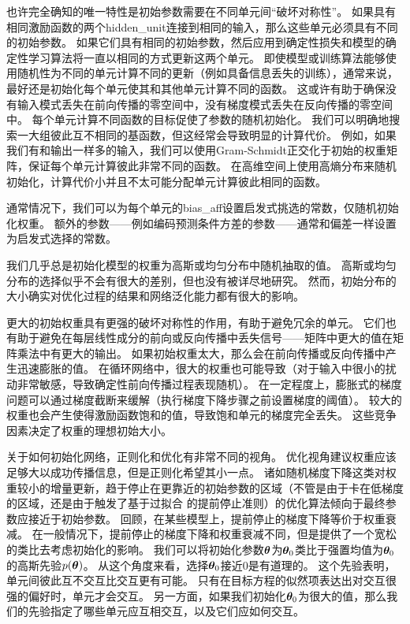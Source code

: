 也许完全确知的唯一特性是初始参数需要在不同单元间``破坏对称性''。
如果具有相同激励函数的两个\gls{hidden_unit}连接到相同的输入，那么这些单元必须具有不同的初始参数。
如果它们具有相同的初始参数，然后应用到确定性损失和模型的确定性学习算法将一直以相同的方式更新这两个单元。
即使模型或训练算法能够使用随机性为不同的单元计算不同的更新（例如具备信息丢失的训练），通常来说，最好还是初始化每个单元使其和其他单元计算不同的函数。
这或许有助于确保没有输入模式丢失在前向传播的零空间中，没有梯度模式丢失在反向传播的零空间中。
每个单元计算不同函数的目标促使了参数的随机初始化。
我们可以明确地搜索一大组彼此互不相同的基函数，但这经常会导致明显的计算代价。  
例如，如果我们有和输出一样多的输入，我们可以使用Gram-Schmidt正交化于初始的权重矩阵，保证每个单元计算彼此非常不同的函数。
在高维空间上使用高熵分布来随机初始化，计算代价小并且不太可能分配单元计算彼此相同的函数。

通常情况下，我们可以为每个单元的\gls{bias_aff}设置启发式挑选的常数，仅随机初始化权重。
额外的参数——例如编码预测条件方差的参数——通常和偏差一样设置为启发式选择的常数。

我们几乎总是初始化模型的权重为高斯或均匀分布中随机抽取的值。
高斯或均匀分布的选择似乎不会有很大的差别，但也没有被详尽地研究。
然而，初始分布的大小确实对优化过程的结果和网络泛化能力都有很大的影响。


更大的初始权重具有更强的破坏对称性的作用，有助于避免冗余的单元。
它们也有助于避免在每层线性成分的前向或反向传播中丢失信号——矩阵中更大的值在矩阵乘法中有更大的输出。
如果初始权重太大，那么会在前向传播或反向传播中产生迅速膨胀的值。
在循环网络中，很大的权重也可能导致（对于输入中很小的扰动非常敏感，导致确定性前向传播过程表现随机）。
在一定程度上，膨胀式的梯度问题可以通过梯度截断来缓解（执行梯度下降步骤之前设置梯度的阈值）。
较大的权重也会产生使得激励函数饱和的值，导致饱和单元的梯度完全丢失。
这些竞争因素决定了权重的理想初始大小。

关于如何初始化网络，正则化和优化有非常不同的视角。
优化视角建议权重应该足够大以成功传播信息，但是正则化希望其小一点。
诸如随机梯度下降这类对权重较小的增量更新，趋于停止在更靠近的初始参数的区域（不管是由于卡在低梯度的区域，还是由于触发了基于过拟合 的提前停止准则）的优化算法倾向于最终参数应接近于初始参数。
回顾，在某些模型上，提前停止的梯度下降等价于权重衰减。
在一般情况下，提前停止的梯度下降和权重衰减不同，但是提供了一个宽松的类比去考虑初始化的影响。
我们可以将初始化参数$\boldsymbol{\theta}$为$\boldsymbol{\theta}_0$类比于强置均值为$\boldsymbol{\theta}_0$的高斯先验$p(\boldsymbol{\theta})$。
从这个角度来看，选择$\boldsymbol{\theta}_0$接近$0$是有道理的。
这个先验表明，单元间彼此互不交互比交互更有可能。
只有在目标方程的似然项表达出对交互很强的偏好时，单元才会交互。
另一方面，如果我们初始化$\boldsymbol{\theta}_0$为很大的值，那么我们的先验指定了哪些单元应互相交互，以及它们应如何交互。

